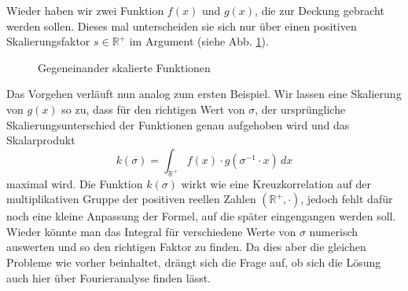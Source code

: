 Wieder haben wir zwei Funktion $f(x)$ und $g(x)$, die zur Deckung gebracht 
werden sollen. Dieses mal unterscheiden sie sich nur 
über einen positiven Skalierungsfaktor $s \in \mathbb{R^+}$ im 
Argument (siehe Abb. \ref{fig:mellin:f2}).
\begin{figure}
    \centering
    \caption{Gegeneinander skalierte Funktionen
    \label{fig:mellin:f2}}
\end{figure}
Das Vorgehen verläuft nun analog zum ersten Beispiel. Wir lassen eine 
Skalierung von $g(x)$ so zu, dass für den richtigen Wert von
$\sigma$, der ursprüngliche Skalierungsunterschied der Funktionen genau 
aufgehoben wird und das Skalarprodukt
\begin{equation}
    k(\sigma) 
    = \int_\mathbb{R^+} f(x) \cdot g(\sigma^{-1} \cdot x)\,dx
    \label{mellin:ksigma}
\end{equation}
maximal wird.
Die Funktion $k(\sigma)$ wirkt wie eine Kreuzkorrelation auf der 
multiplikativen Gruppe der positiven reellen Zahlen $(\mathbb{R^+},\cdot)$, 
jedoch fehlt dafür noch eine kleine Anpassung der Formel, auf die später 
eingengangen werden soll. 
Wieder könnte man das Integral für verschiedene Werte von $\sigma$ 
numerisch auswerten und so den richtigen Faktor zu finden. 
Da dies aber die gleichen Probleme wie vorher beinhaltet, drängt sich die 
Frage auf, ob sich die Lösung auch hier über Fourieranalyse finden lässt.